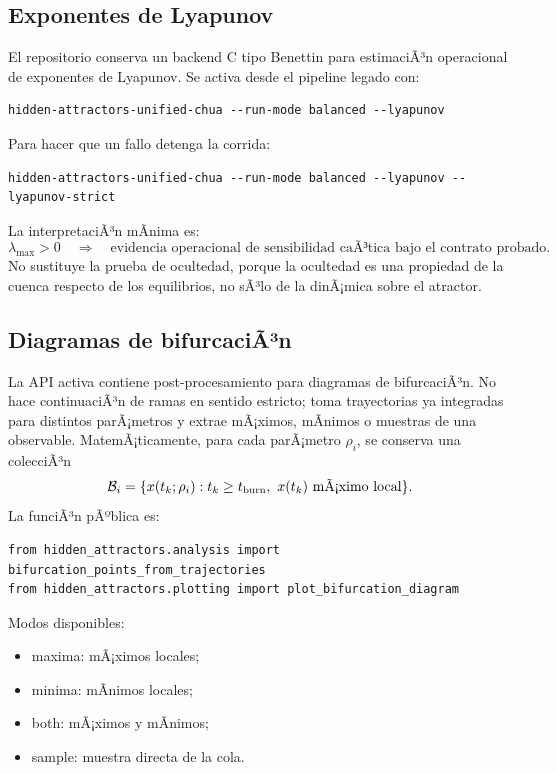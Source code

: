 \documentclass[11pt]{article}
\DeclareRobustCommand{\codepath}[1]{\begingroup\Urlmuskip=0mu plus 2mu\path{#1}\endgroup}
\def\codepath#1{#1}%
\begin{document}
\subsection{Exponentes de Lyapunov}

El repositorio conserva un backend C tipo Benettin para estimaciÃ³n operacional de exponentes de Lyapunov. Se activa desde el pipeline legado con:
\begin{lstlisting}
hidden-attractors-unified-chua --run-mode balanced --lyapunov
\end{lstlisting}
Para hacer que un fallo detenga la corrida:
\begin{lstlisting}
hidden-attractors-unified-chua --run-mode balanced --lyapunov --lyapunov-strict
\end{lstlisting}
La interpretaciÃ³n mÃ­nima es:
\begin{equation}
\lambda_{\max}>0
\quad\Rightarrow\quad
\text{evidencia operacional de sensibilidad caÃ³tica bajo el contrato probado.}
\end{equation}
No sustituye la prueba de ocultedad, porque la ocultedad es una propiedad de la cuenca respecto de los equilibrios, no sÃ³lo de la dinÃ¡mica sobre el atractor.

\subsection{Diagramas de bifurcaciÃ³n}

La API activa contiene post-procesamiento para diagramas de bifurcaciÃ³n. No hace continuaciÃ³n de ramas en sentido estricto; toma trayectorias ya integradas para distintos parÃ¡metros y extrae mÃ¡ximos, mÃ­nimos o muestras de una observable. MatemÃ¡ticamente, para cada parÃ¡metro \(\rho_i\), se conserva una colecciÃ³n
\begin{equation}
\mathcal B_i=\{x(t_k;\rho_i):t_k\geq t_{\rm burn},\ x(t_k)\text{ mÃ¡ximo local}\}.
\end{equation}
La funciÃ³n pÃºblica es:
\begin{lstlisting}
from hidden_attractors.analysis import bifurcation_points_from_trajectories
from hidden_attractors.plotting import plot_bifurcation_diagram
\end{lstlisting}
Modos disponibles:
\begin{itemize}
\item \codepath{maxima}: mÃ¡ximos locales;
\item \codepath{minima}: mÃ­nimos locales;
\item \codepath{both}: mÃ¡ximos y mÃ­nimos;
\item \codepath{sample}: muestra directa de la cola.
\end{itemize}
\end{document}
